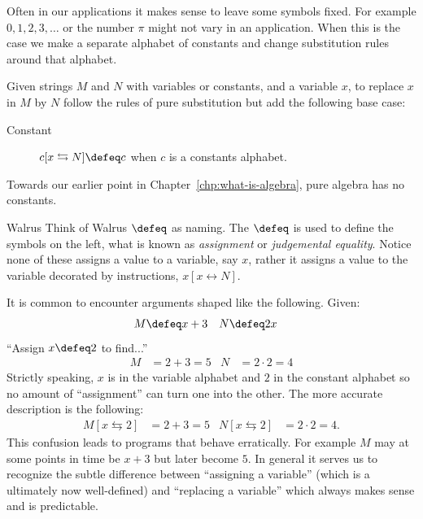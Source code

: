 Often in our applications it makes sense to leave some symbols fixed.
For example $0,1,2,3,\ldots$ or the number $\pi$ might not vary in an application.
When this is the case we make a separate alphabet of constants and change substitution 
rules around that alphabet.
\begin{definition}
    Given strings $M$ and $N$ with variables or constants, 
    and a variable $x$, to replace $x$ in $M$ by $N$ 
    follow the rules of pure substitution but add the following  base case:
    \begin{description}
        \item[Constant] $c[x\leftrightarrows N]\defeq c$ when $c$ is a constants alphabet. 
    \end{description}
\end{definition}

Towards our earlier point in Chapter~\ref{chp:what-is-algebra}, pure algebra has no constants.

\begin{remark}{Walrus}
    Think of Walrus $\defeq$ as  naming.
    The $\defeq$ is used to define the symbols on the left, what is 
    known as \emph{assignment} or \emph{judgemental equality}.  Notice none of 
    these assigns a value to a variable, say $x$, rather it assigns a value to the variable 
    decorated by instructions, $x[x\leftrightarrow N]$.  
    
    It is common to encounter arguments shaped like the following.  Given:
    \begin{align*}
        M & \defeq x+3 & N & \defeq 2x
    \end{align*}
    ``Assign $x \defeq 2$ to find...''
    \begin{align*}
        M  & = 2+3 =5 & N & = 2\cdot 2 =4
    \end{align*}
    Strictly speaking, $x$ is in the variable alphabet and $2$ in the constant 
    alphabet so no amount of ``assignment'' can turn one into the other.
    The more accurate description is the following:
    \begin{align*}
        M[x\leftrightarrows 2] & = 2+3=5 & N[x\leftrightarrows 2] & = 2\cdot 2=4.
    \end{align*}
    This confusion leads to programs that behave erratically. For example $M$
    may at some points in time be $x+3$ but later become $5$. In general it
    serves us to recognize the subtle difference between ``assigning a
    variable'' (which is a ultimately now well-defined) 
    and ``replacing a variable'' which always makes sense and is predictable.
\end{remark}

